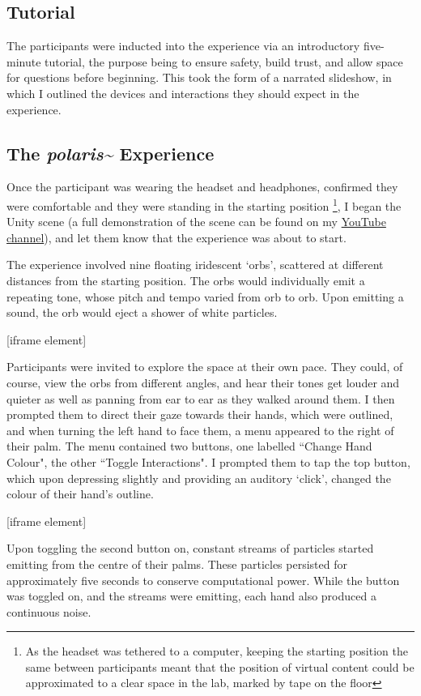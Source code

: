 \subsection{Tutorial}\label{sec: polaris-study-tutorial}
The participants were inducted into the experience via an introductory five-minute tutorial, the purpose being to ensure safety, build trust, and allow space for questions before beginning. This took the form of a narrated slideshow, in which I outlined the devices and interactions they should expect in the experience.

\subsection{The \textit{polaris\textasciitilde{}} Experience}\label{sec: polaris-study-experience}
Once the participant was wearing the headset and headphones, confirmed they were comfortable and they were standing in the starting position \footnote{As the headset was tethered to a computer, keeping the starting position the same between participants meant that the position of virtual content could be approximated to a clear space in the lab, marked by tape on the floor}, I began the Unity scene (a full demonstration of the scene can be found on my \href{https://youtu.be/lCBgMs8ULj0}{YouTube channel}), and let them know that the experience was about to start.

The experience involved nine floating iridescent ‘orbs’, scattered at different distances from the starting position. The orbs would individually emit a repeating tone, whose pitch and tempo varied from orb to orb. Upon emitting a sound, the orb would eject a shower of white particles.

[iframe element]

Participants were invited to explore the space at their own pace. They could, of course, view the orbs from different angles, and hear their tones get louder and quieter as well as panning from ear to ear as they walked around them.
I then prompted them to direct their gaze towards their hands, which were outlined, and when turning the left hand to face them, a menu appeared to the right of their palm. The menu contained two buttons, one labelled ``Change Hand Colour", the other ``Toggle Interactions". I prompted them to tap the top button, which upon depressing slightly and providing an auditory ‘click’, changed the colour of their hand’s outline.

[iframe element]

Upon toggling the second button on, constant streams of particles started emitting from the centre of their palms. These particles persisted for approximately five seconds to conserve computational power. While the button was toggled on, and the streams were emitting, each hand also produced a continuous noise.

